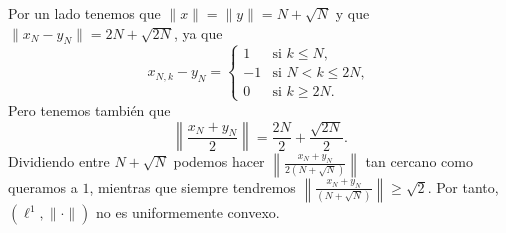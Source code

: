 \begin{example}
    Por un lado tenemos que $ \|x\| = \|y\| = N + \sqrt{N} $ y que $ \|x_N - y_N\| = 2N + \sqrt{2N} $, ya que
    \begin{equation}
        x_{N, k} - y_N =
        \begin{cases}
            1 & \text{si } k \leq N, \\
            -1 & \text{si } N < k \leq 2N, \\
            0 & \text{si } k \geq 2N.
        \end{cases}
    \end{equation}
    Pero tenemos también que
    \begin{equation}
        \left\| \frac{x_N+y_N}{2} \right\| = \frac{2N}{2} + \frac{\sqrt{2N}}{2}.
    \end{equation}
    Dividiendo entre $ N + \sqrt{N} $ podemos hacer $ \left\| \frac{x_N+y_N}{2 (N + \sqrt{N})} \right\| $ tan cercano como queramos a $ 1 $, mientras que siempre tendremos $ \left\| \frac{x_N+y_N}{(N + \sqrt{N})} \right\| \geq \sqrt{2}$. Por tanto, $ (\ell^1, \| \cdot \|) $ no es uniformemente convexo.
\end{example}